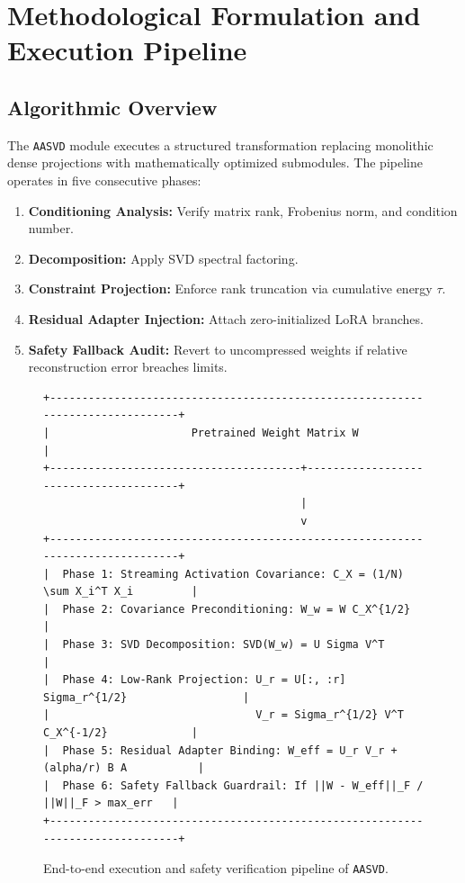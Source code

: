 \section{Methodological Formulation and Execution Pipeline}

\subsection{Algorithmic Overview}
The \texttt{AASVD} module executes a structured transformation replacing monolithic dense projections with mathematically optimized submodules. The pipeline operates in five consecutive phases:
\begin{enumerate}
  \item \textbf{Conditioning Analysis:} Verify matrix rank, Frobenius norm, and condition number.
  \item \textbf{Decomposition:} Apply SVD spectral factoring.
  \item \textbf{Constraint Projection:} Enforce rank truncation via cumulative energy $\tau$.
  \item \textbf{Residual Adapter Injection:} Attach zero-initialized LoRA branches.
  \item \textbf{Safety Fallback Audit:} Revert to uncompressed weights if relative reconstruction error breaches limits.
\end{enumerate}

\begin{figure}[t]
\centering
\begin{verbatim}
+-------------------------------------------------------------------------------+
|                      Pretrained Weight Matrix W                               |
+---------------------------------------+---------------------------------------+
                                        |
                                        v
+-------------------------------------------------------------------------------+
|  Phase 1: Streaming Activation Covariance: C_X = (1/N) \sum X_i^T X_i         |
|  Phase 2: Covariance Preconditioning: W_w = W C_X^{1/2}                       |
|  Phase 3: SVD Decomposition: SVD(W_w) = U Sigma V^T                           |
|  Phase 4: Low-Rank Projection: U_r = U[:, :r] Sigma_r^{1/2}                  |
|                                V_r = Sigma_r^{1/2} V^T C_X^{-1/2}             |
|  Phase 5: Residual Adapter Binding: W_eff = U_r V_r + (alpha/r) B A           |
|  Phase 6: Safety Fallback Guardrail: If ||W - W_eff||_F / ||W||_F > max_err   |
+-------------------------------------------------------------------------------+
\end{verbatim}
\caption{End-to-end execution and safety verification pipeline of \texttt{AASVD}.}
\end{figure}

